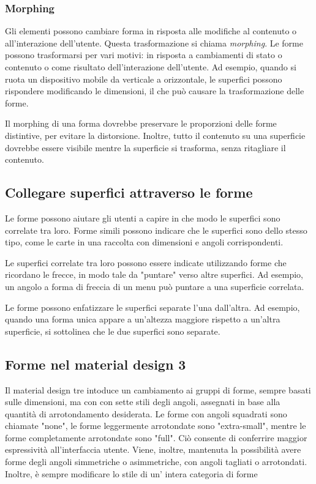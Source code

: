 \documentclass[12pt, a4paper]{report}
\begin{document}
	\subsubsection{Morphing}
	Gli elementi possono cambiare forma in risposta alle modifiche al contenuto o all'interazione dell'utente. Questa trasformazione si chiama \textit{morphing}. Le forme possono trasformarsi per vari motivi: in risposta a cambiamenti di stato o contenuto o come risultato dell'interazione dell'utente. Ad esempio, quando si ruota un
	dispositivo mobile da verticale a orizzontale, le superfici possono rispondere modificando le dimensioni, il che può causare la trasformazione delle forme.

	Il morphing di una forma dovrebbe preservare le proporzioni delle forme distintive, per evitare la distorsione.
	Inoltre, tutto il contenuto su una superficie dovrebbe essere visibile mentre la superficie si trasforma, senza ritagliare il contenuto.

	\subsection{Collegare superfici attraverso le forme}
	Le forme possono aiutare gli utenti a capire in che modo le superfici sono correlate tra loro.
	Forme simili possono indicare che le superfici sono dello stesso tipo, come le carte in una raccolta con dimensioni e angoli corrispondenti.

	Le superfici correlate tra loro possono essere indicate utilizzando forme che ricordano le frecce, in modo tale da "puntare" verso altre superfici. Ad esempio, un angolo a forma di freccia di un menu può puntare a una superficie correlata.


	Le forme possono enfatizzare le superfici separate l'una dall'altra. Ad esempio, quando una forma unica appare a un'altezza maggiore rispetto a un'altra superficie, si sottolinea che le due superfici sono separate.

	\subsection{Forme nel material design 3}
	Il material design tre intoduce un cambiamento ai gruppi di forme, sempre basati sulle dimensioni, ma con con sette stili degli angoli, assegnati in base alla quantità di arrotondamento desiderata. Le forme con angoli squadrati sono chiamate "none", le forme leggermente arrotondate sono "extra-small", mentre le forme completamente arrotondate sono "full".
	Ciò consente di conferrire maggior espressività all'interfaccia utente. Viene, inoltre, mantenuta la possibilità avere forme degli angoli simmetriche o asimmetriche, con angoli tagliati o arrotondati. Inoltre, è sempre modificare lo stile di un' intera categoria di forme
\end{document}
